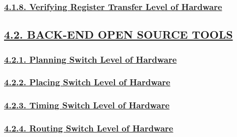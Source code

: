 \documentclass[
]{article}
\begin{document}
\hypertarget{verifying-register-transfer-level-of-hardware}{%
\subsubsection{\texorpdfstring{\protect\hyperlink{verifying-register-transfer-level-of-hardware-1}{4.1.8.
Verifying Register Transfer Level of
Hardware}}{4.1.8. Verifying Register Transfer Level of Hardware}}\label{verifying-register-transfer-level-of-hardware}}

\hypertarget{back-end-open-source-tools}{%
\subsection{\texorpdfstring{\protect\hyperlink{back-end-open-source-tools-2}{4.2.
BACK-END OPEN SOURCE
TOOLS}}{4.2. BACK-END OPEN SOURCE TOOLS}}\label{back-end-open-source-tools}}

\hypertarget{planning-switch-level-of-hardware}{%
\subsubsection{\texorpdfstring{\protect\hyperlink{planning-switch-level-of-hardware-1}{4.2.1.
Planning Switch Level of
Hardware}}{4.2.1. Planning Switch Level of Hardware}}\label{planning-switch-level-of-hardware}}

\hypertarget{placing-switch-level-of-hardware}{%
\subsubsection{\texorpdfstring{\protect\hyperlink{placing-switch-level-of-hardware-1}{4.2.2.
Placing Switch Level of
Hardware}}{4.2.2. Placing Switch Level of Hardware}}\label{placing-switch-level-of-hardware}}

\hypertarget{timing-switch-level-of-hardware}{%
\subsubsection{\texorpdfstring{\protect\hyperlink{timing-switch-level-of-hardware-1}{4.2.3.
Timing Switch Level of
Hardware}}{4.2.3. Timing Switch Level of Hardware}}\label{timing-switch-level-of-hardware}}

\hypertarget{routing-switch-level-of-hardware}{%
\subsubsection{\texorpdfstring{\protect\hyperlink{routing-switch-level-of-hardware-1}{4.2.4.
Routing Switch Level of
Hardware}}{4.2.4. Routing Switch Level of Hardware}}\label{routing-switch-level-of-hardware}}
\end{document}
